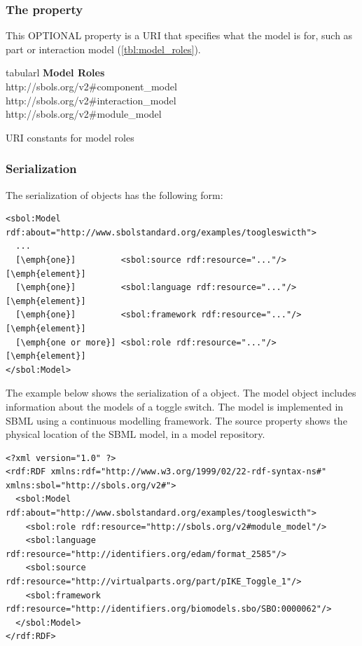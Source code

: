 
\subsubsection*{ The  property}
This OPTIONAL property is a URI that specifies what the model is for, such as part or interaction model (\ref{tbl:model_roles}).


\begin{table}[ht]
  \begin{edtable}{tabular}{l}
    \toprule
    \textbf{Model Roles}  \\
    \midrule
    http://sbols.org/v2\#component\_model\\
    http://sbols.org/v2\#interaction\_model\\
    http://sbols.org/v2\#module\_model\\    
    \bottomrule
  \end{edtable}
  \caption{URI constants for model roles}
  \label{tbl:model_roles}
\end{table}

\subsubsection*{Serialization}

The serialization of  objects has the following form:

\begin{lstlisting}
<sbol:Model rdf:about="http://www.sbolstandard.org/examples/toogleswicth">
  ...
  [\emph{one}]         <sbol:source rdf:resource="..."/> [\emph{element}]
  [\emph{one}]         <sbol:language rdf:resource="..."/> [\emph{element}]
  [\emph{one}]         <sbol:framework rdf:resource="..."/> [\emph{element}]
  [\emph{one or more}] <sbol:role rdf:resource="..."/> [\emph{element}]
</sbol:Model>
\end{lstlisting}

The example below shows the serialization of a  object. The model object includes information about the models of a toggle switch. The model is implemented in SBML using a continuous modelling framework. The source property shows the physical location of the SBML model, in a model repository. 
\begin{lstlisting}
<?xml version="1.0" ?>
<rdf:RDF xmlns:rdf="http://www.w3.org/1999/02/22-rdf-syntax-ns#" xmlns:sbol="http://sbols.org/v2#">
  <sbol:Model rdf:about="http://www.sbolstandard.org/examples/toogleswicth">
    <sbol:role rdf:resource="http://sbols.org/v2#module_model"/>
    <sbol:language rdf:resource="http://identifiers.org/edam/format_2585"/>
    <sbol:source rdf:resource="http://virtualparts.org/part/pIKE_Toggle_1"/>
    <sbol:framework rdf:resource="http://identifiers.org/biomodels.sbo/SBO:0000062"/>
  </sbol:Model>
</rdf:RDF>

\end{lstlisting}
\label{ser:Model}




